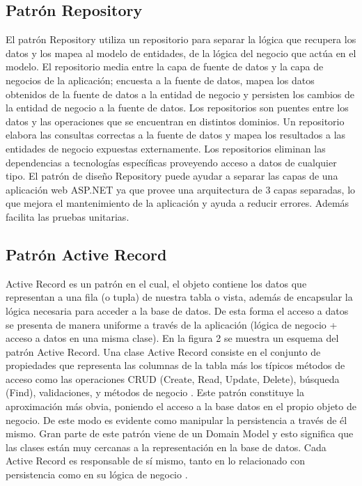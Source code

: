 \documentclass[preprint,12pt]{elsarticle}
\begin{document}
\subsection{Patrón Repository}	
El patrón Repository  utiliza un repositorio para separar la lógica que recupera los datos y los mapea al modelo  de  entidades,  de  la  lógica  del    negocio  que  actúa  en  el  modelo.  El  repositorio  media  entre  la capa de fuente de datos y la capa de negocios de la aplicación; encuesta a la fuente de datos, mapea los datos obtenidos de la fuente de datos a la entidad de negocio y persisten los cambios de la entidad de negocio a la fuente de datos. 
Los repositorios son puentes entre los datos y las operaciones que se encuentran en distintos dominios. Un  repositorio  elabora  las  consultas  correctas  a  la  fuente  de  datos  y  mapea  los  resultados  a  las entidades de negocio expuestas externamente. Los repositorios eliminan las dependencias a tecnologías específicas proveyendo acceso a datos de cualquier tipo.
El patrón de diseño Repository puede ayudar a separar las capas de una aplicación web  ASP.NET ya que provee una arquitectura de 3 capas separadas,  lo que mejora el mantenimiento de la aplicación y ayuda a reducir errores.  Además facilita las pruebas unitarias.\citep {referencia02}	


\subsection{Patrón Active Record}
Active Record es un patrón en el cual, el objeto contiene los datos que representan a una fila (o tupla)
de nuestra tabla o vista, además de encapsular la lógica necesaria para acceder a la base de datos. De
esta forma el acceso a datos se presenta de manera uniforme a través de la aplicación (lógica de negocio
+ acceso a datos en una misma clase). En la figura 2 se muestra un esquema del patrón Active Record.
Una clase Active Record consiste en el conjunto de propiedades que representa las columnas de la tabla
más los típicos métodos de acceso como las operaciones CRUD (Create, Read, Update, Delete),
búsqueda (Find), validaciones, y métodos de negocio \citep {referencia06}.
Este patrón constituye la aproximación más obvia, poniendo el acceso a la base datos en el propio
objeto de negocio. De este modo es evidente como manipular la persistencia a través de él mismo. Gran
parte de este patrón viene de un Domain Model y esto significa que las clases están muy cercanas a la
representación en la base de datos. Cada Active Record es responsable de sí mismo, tanto en lo
relacionado con persistencia como en su lógica de negocio \citep {referencia02}.
\end{document}
